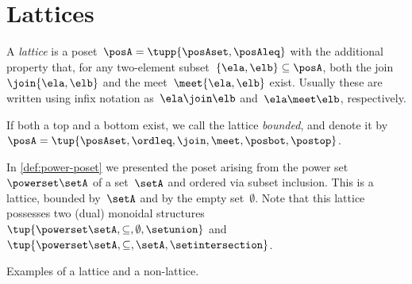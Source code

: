 
\section{Lattices}


\begin{definition}[Lattice]
    \label{def:lattice}
    A \emph{lattice} is a poset~$\posA=\tupp{\posAset,\posAleq}$ with the additional property that, for any two-element subset~$\{\ela, \elb \} \subseteq \posA$, both the join~$\join \{\ela, \elb \}$ and the meet~$\meet \{\ela, \elb \}$ exist.
    Usually these are written using infix notation as~$\ela \join \elb$ and~$\ela \meet \elb$, respectively.
\end{definition}

\begin{marginfigure}
    \begin{center}
    \end{center}
    \caption{}
\end{marginfigure}

\begin{remark}
    \label{rem:bounded-lattices}
    If both a top and a bottom exist, we call the lattice \emph{bounded}, and denote it by~$\posA = \tup{\posAset,\ordleq,\join,\meet,\posbot,\postop}$.
\end{remark}

\begin{example}
    In \cref{def:power-poset} we presented the poset arising from the power set~$\powerset \setA$ of a set~$\setA$ and ordered via subset inclusion.
    This is a lattice, bounded by~$\setA$ and by the empty set~$\emptyset$.
    Note that this lattice possesses two (dual) monoidal structures~$\tup{\powerset \setA,\subseteq,\emptyset,\setunion}$ and~$\tup{\powerset \setA,\subseteq,\setA,\setintersection}$.
\end{example}

\begin{marginfigure}
    \centering

    \caption{Examples of a lattice and a non-lattice. }
    \label{fig:exlattice}
\end{marginfigure}

